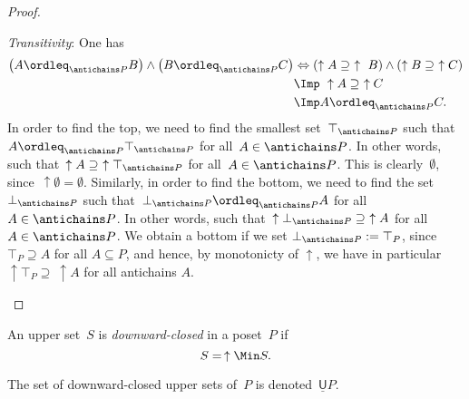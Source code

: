 \begin{proof}
\begin{compactitem}
\item \emph{Transitivity}: One has
\begin{equation}
    \begin{aligned}
    \left(A\ordleq_{\antichains P} B\right) \wedge \left(B\ordleq_{\antichains P} C\right)&\Leftrightarrow  \left(\uparrow A \supseteq \ \uparrow \ B\right) \wedge \left( \uparrow  B\supseteq \ \uparrow C\right)\\
    &\Imp \ \uparrow A\supseteq \ \uparrow C\\
    &\Imp A\ordleq_{\antichains P}C.
    \end{aligned}
\end{equation}
In order to find the top, we need to find the smallest set~$\top_{\antichains P}$ such that~$A\ordleq_{\antichains P} \top_{\antichains P}$ for all~$A\in \antichains P$. In other words, such that~$\uparrow A\supseteq \ \uparrow \top_{\antichains P}$ for all~$A\in \antichains P$. This is clearly~$\emptyset$, since~$\uparrow \emptyset = \emptyset$. Similarly, in order to find the bottom, we need to find the set~$\bot_{\antichains P}$ such that~$\bot_{\antichains P} \ordleq_{\antichains P} A$ for all~$A\in \antichains P$. In other words, such that~$\uparrow \bot_{\antichains P} \supseteq \ \uparrow A$ for all~$A\in \antichains P$. We obtain a bottom if we set $\bot_{\antichains P} := \top_P$, since $\top_P \supseteq A$ for all $A \subseteq P$, and hence, by monotonicty of $\uparrow$, we have in particular $\uparrow \top_P \supseteq \ \uparrow A$ for all antichains $A$. 
\end{compactitem}
\end{proof}



\begin{definition}
\label{def:downward-closed-upperset}
An upper set~$S$ is \emph{downward-closed} in a poset~$P$ if
\begin{equation}
    S =\, \uparrow \Min S.
\end{equation}
\end{definition}

\begin{remark}
The set of downward-closed upper sets of~$P$ is denoted~$\underline{\mathsf{U}}P$.
\end{remark}


    
